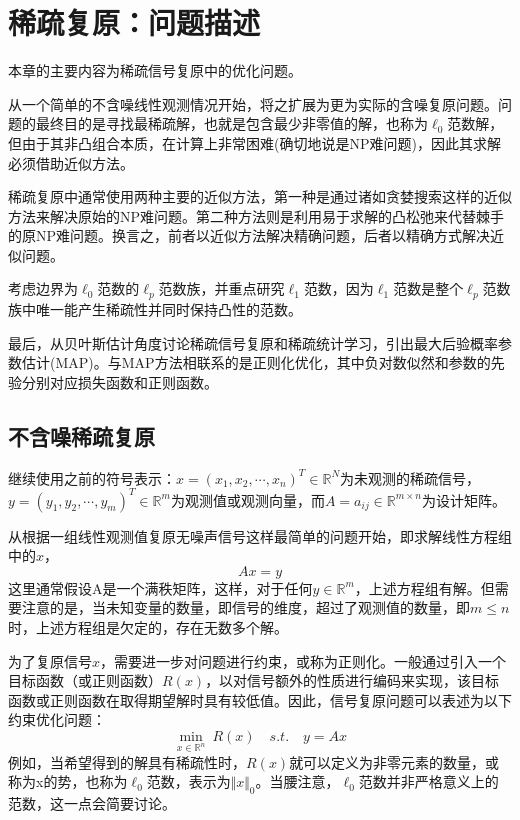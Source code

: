 \chapter{稀疏复原：问题描述}\label{chap:srt01:problem}

本章的主要内容为稀疏信号复原中的优化问题。

从一个简单的不含噪线性观测情况开始，将之扩展为更为实际的含噪复原问题。问题的最终目的是寻找最稀疏解，也就是包含最少非零值的解，也称为$\ell_0$范数解，但由于其非凸组合本质，在计算上非常困难(确切地说是NP难问题)，因此其求解必须借助近似方法。

稀疏复原中通常使用两种主要的近似方法，第一种是通过诸如贪婪搜索这样的近似方法来解决原始的NP难问题。第二种方法则是利用易于求解的凸松弛来代替棘手的原NP难问题。换言之，前者以近似方法解决精确问题，后者以精确方式解决近似问题。

考虑边界为$ \ell_0 $范数的$ \ell_p $范数族，并重点研究$ \ell_1 $范数，因为$ \ell_1 $范数是整个$ \ell_p $范数族中唯一能产生稀疏性并同时保持凸性的范数。

最后，从贝叶斯估计角度讨论稀疏信号复原和稀疏统计学习，引出最大后验概率参数估计(MAP)。与MAP方法相联系的是正则化优化，其中负对数似然和参数的先验分别对应损失函数和正则函数。

\section{不含噪稀疏复原}

继续使用之前的符号表示：$\mathit{x}=(x_1,x_2,\cdots,x_n)^T\in \mathbb{R}^N$为未观测的稀疏信号，$ y=(y_1,y_2,\cdots,y_m)^T\in \mathbb{R}^m $为观测值或观测向量，而$ A={a_{ij}}\in \mathbb{R}^{m\times n} $为设计矩阵。

从根据一组线性观测值复原无噪声信号这样最简单的问题开始，即求解线性方程组中的$ x $，
\begin{equation}\label{key}
Ax=y
\end{equation}
这里通常假设A是一个满秩矩阵，这样，对于任何$ y\in \mathbb{R}^m $，上述方程组有解。但需要注意的是，当未知变量的数量，即信号的维度，超过了观测值的数量，即$ m\leq n $时，上述方程组是欠定的，存在无数多个解。

为了复原信号$ x $，需要进一步对问题进行约束，或称为正则化。一般通过引入一个目标函数（或正则函数）$ R(x) $，以对信号额外的性质进行编码来实现，该目标函数或正则函数在取得期望解时具有较低值。因此，信号复原问题可以表述为以下约束优化问题：
\begin{equation}\label{key}
\min_{x\in \mathbb{R}^n}\: R(x)\quad s.t.\quad y=Ax
\end{equation}
例如，当希望得到的解具有稀疏性时，$ R(x) $就可以定义为非零元素的数量，或称为x的势，也称为$ \ell_0 $范数，表示为$ \Vert x \Vert_0 $。当腰注意，$ \ell_0 $范数并非严格意义上的范数，这一点会简要讨论。

